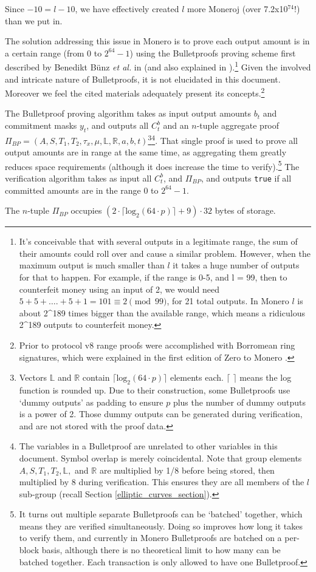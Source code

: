 Since $-10 = l-10$, we have effectively created $l$ more Moneroj (over 7.2x10$^{74}$!) than we put in.

The solution addressing this issue in Monero is to prove each output amount is in a certain range (from 0 to $2^{64}-1$) using the Bulletproofs proving scheme first described by Benedikt B\"{u}nz {\em et al.} in \cite{Bulletproofs_paper} (and also explained in \cite{adam-zero-to-bulletproofs,dalek-bulletproofs-notes}).\footnote{It's conceivable that with several outputs in a legitimate range, the sum of their amounts could roll over and cause a similar problem. However, when the maximum output is much smaller than $l$ it takes a huge number of outputs for that to happen. For example, if the range is 0-5, and l = 99, then to counterfeit money using an input of 2, we would need $5 + 5 + …. + 5 + 1 = 101 \equiv 2 \pmod{99}$, for 21 total outputs. In Monero $l$ is about 2\^{}189 times bigger than the available range, which means a ridiculous 2\^{}189 outputs to counterfeit money.} Given the involved and intricate nature of Bulletproofs, it is not elucidated in this document. Moreover we feel the cited materials adequately present its concepts.\footnote{Prior to protocol v8 range proofs were accomplished with Borromean ring signatures, which were explained in the first edition of Zero to Monero \cite{ztm-1}.}

The Bulletproof proving algorithm takes as input output amounts $b_t$ and commitment masks $y_t$, and outputs all $C^b_t$ and an $n$-tuple aggregate proof $\Pi_{BP} = (A, S, T_1, T_2, \tau_x, \mu, \mathbb{L}, \mathbb{R}, a, b, t)$\footnote{Vectors $\mathbb{L}$ and $\mathbb{R}$ contain $\lceil \textrm{log}_2(64 \cdot p) \rceil$ elements each. $\lceil$ $\rceil$ means the log function is rounded up. Due to their construction, some Bulletproofs use `dummy outputs' as padding to ensure $p$ plus the number of dummy outputs is a power of 2. Those dummy outputs can be generated during verification, and are not stored with the proof data.}\footnote{The variables in a Bulletproof are unrelated to other variables in this document. Symbol overlap is merely coincidental. Note that group elements $A, S, T_1, T_2, \mathbb{L},$ and $\mathbb{R}$ are multiplied by 1/8 before being stored, then multiplied by 8 during verification. This ensures they are all members of the $l$ sub-group (recall Section \ref{elliptic_curves_section}).}. That single proof is used to prove all output amounts are in range at the same time, as aggregating them greatly reduces space requirements (although it does increase the time to verify).\footnote{It turns out multiple separate Bulletproofs can be `batched' together, which means they are verified simultaneously. Doing so improves how long it takes to verify them, and currently in Monero Bulletproofs are batched on a per-block basis, although there is no theoretical limit to how many can be batched together. Each transaction is only allowed to have one Bulletproof.} The verification algorithm takes as input all $C^b_t$, and $\Pi_{BP}$, and outputs {\tt true} if all committed amounts are in the range 0 to $2^{64} - 1$.

The $n$-tuple $\Pi_{BP}$ occupies $(2 \cdot \lceil \textrm{log}_2(64 \cdot p) \rceil + 9) \cdot 32$ bytes of storage.